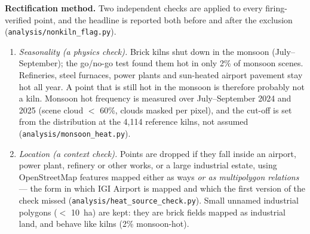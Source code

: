\documentclass[11pt,a4paper]{article}
\begin{document}
\textbf{Rectification method.} Two independent checks are
applied to every firing-verified point, and the headline is reported both
before and after the exclusion (\texttt{analysis/nonkiln\_flag.py}).
\begin{enumerate}[leftmargin=*]
\item \emph{Seasonality (a physics check).} Brick kilns shut down in the monsoon
(July--September); the go/no-go test found them hot in only 2\% of monsoon
scenes. Refineries, steel furnaces, power plants and sun-heated airport pavement
stay hot all year. A point that is still hot in the monsoon is therefore
probably not a kiln. Monsoon hot frequency is measured over July--September 2024
and 2025 (scene cloud $<$ 60\%, clouds masked per pixel), and the cut-off is set
from the distribution at the 4{,}114 reference kilns, not assumed
(\texttt{analysis/monsoon\_heat.py}).
\item \emph{Location (a context check).} Points are dropped if they fall inside
an airport, power plant, refinery or other works, or a large industrial estate,
using OpenStreetMap features mapped either as ways \emph{or as multipolygon
relations} --- the form in which IGI Airport is mapped and which the first
version of the check missed (\texttt{analysis/heat\_source\_check.py}).
Small unnamed industrial polygons ($<$ 10~ha) are kept: they are brick fields
mapped as industrial land, and behave like kilns (2\% monsoon-hot).
\end{enumerate}
\end{document}
